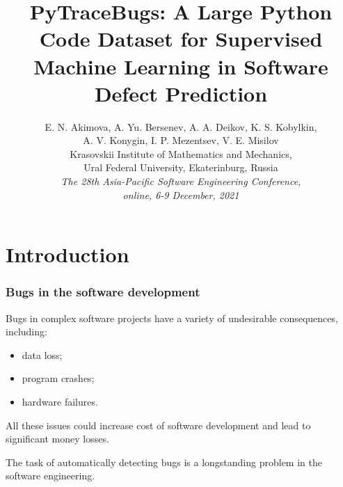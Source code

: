 \documentclass{beamer}
\begin{document}
\title[PyTraceBugs: A Large Python Code Dataset for Software Defect Prediction]{PyTraceBugs: A Large Python Code Dataset
for Supervised Machine Learning
in Software Defect Prediction}
\author[E. N. Akimova et.al]{\begin{block}{}\begin{center} {E. N. Akimova, A. Yu. Bersenev, A. A. Deikov, K. S. Kobylkin,\\ A. V. Konygin, I. P. Mezentsev, V. E. Misilov} \\
{\footnotesize Krasovskii Institute of Mathematics and Mechanics,}\\
{\footnotesize Ural Federal University, Ekaterinburg, Russia}\\
{\textsl{The 28th Asia-Pacific Software Engineering Conference, \\ online, 6-9 December, 2021}}\end{center}\end{block}}
\date{}
\begin{frame}
\titlepage
\end{frame}


\section{Introduction}

\begin{frame}
\frametitle{Bugs in the software development}

Bugs in complex software projects have a variety of undesirable consequences,
including:
\begin{itemize}
\item data loss;
\item program crashes;
\item hardware failures.
\end{itemize}
All these issues could increase cost of software development
and lead to significant money losses. 
\newline

The task of automatically detecting bugs is a longstanding problem in the software engineering.

\end{frame}


\end{document}
